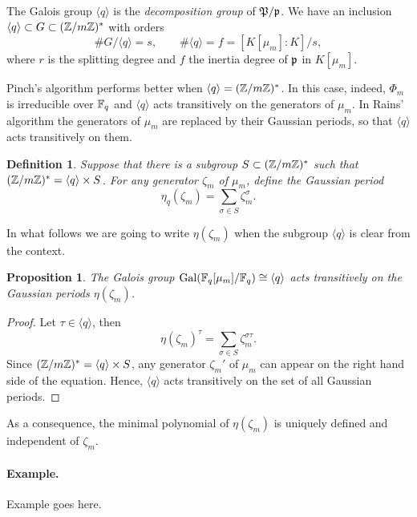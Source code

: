 \documentclass{article}
\newtheorem{Def}{Definition}
\newtheorem{Prop}{Proposition}
\begin{document}
The Galois group $\langle q\rangle$ is the \emph{decomposition group}
of $\frak{P}/\frak{p}$. We have an inclusion $\langle q\rangle\subset
G\subset(\mathbb{Z}/m\mathbb{Z})^\ast$ with orders
\begin{equation} \# G/\langle q\rangle = s,\qquad \#\langle q\rangle =
f = [K[\mu_m]:K]/s,
\end{equation}
where $r$ is the splitting degree and $f$ the inertia degree of
$\frak{p}$ in $K[\mu_m]$.

Pinch's algorithm performs better when $\langle q\rangle =
(\mathbb{Z}/m\mathbb{Z})^\ast$. In this case, indeed, $\Phi_m$ is irreducible over
$\mathbb{F}_q$ and $\langle q\rangle$ acts transitively on the generators of
$\mu_m$. In Rains' algorithm the generators of $\mu_m$ are replaced by
their Gaussian periods, so that $\langle q\rangle$ acts transitively
on them.

\begin{Def}
  \label{def:period}
  Suppose that there is a subgroup $S\subset (\mathbb{Z}/m\mathbb{Z})^\ast$ such that
  $(\mathbb{Z}/m\mathbb{Z})^\ast = \langle q\rangle\times S$. For any generator
  $\zeta_m$ of $\mu_m$, define the Gaussian period
  \begin{equation}
    \label{eq:period} \eta_q(\zeta_m) = \sum_{\sigma\in
S}\zeta_m^\sigma.
\end{equation}
\end{Def}

In what follows we are going to write $\eta(\zeta_m)$ when the
subgroup $\langle q\rangle$ is clear from the context.

\begin{Prop}
  The Galois group $\operatorname{Gal}(\mathbb{F}_q[\mu_m]/\mathbb{F}_q)\cong\langle q\rangle$ acts
  transitively on the Gaussian periods $\eta(\zeta_m)$.
\end{Prop}
\begin{proof}
  Let $\tau\in\langle q\rangle$, then
  \begin{equation} \eta(\zeta_m)^\tau = \sum_{\sigma\in S}
\zeta_m^{\sigma\tau}.
  \end{equation}
  Since $(\mathbb{Z}/m\mathbb{Z})^\ast=\langle q\rangle\times S$, any generator
  $\zeta_m'$ of $\mu_m$ can appear on the right hand side of the
  equation. Hence, $\langle q\rangle$ acts transitively on the set of
  all Gaussian periods.
\end{proof}

As a consequence, the minimal polynomial of $\eta(\zeta_m)$ is
uniquely defined and independent of $\zeta_m$.

\paragraph{Example.} Example goes here.
\end{document}
